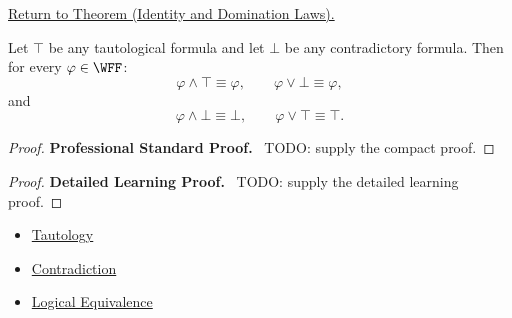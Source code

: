\newpage
{}
\label{prf:identity-domination-laws-propositional-logic}

\begin{remark*}[Return]
\hyperref[thm:identity-domination-laws-propositional-logic]{Return to Theorem (Identity and Domination Laws).}
\end{remark*}

\begin{theorem*}
Let \(\top\) be any tautological formula and let \(\bot\) be any contradictory formula. Then for every \(\varphi\in\WFF\):
\[
\varphi\land\top\equiv\varphi,
\qquad
\varphi\lor\bot\equiv\varphi,
\]
and
\[
\varphi\land\bot\equiv\bot,
\qquad
\varphi\lor\top\equiv\top.
\]
\end{theorem*}

\begin{proof}
\textbf{Professional Standard Proof.}~
TODO: supply the compact proof.
\end{proof}

\begin{proof}
\textbf{Detailed Learning Proof.}~
TODO: supply the detailed learning proof.
\end{proof}

\begin{remark*}
\end{remark*}

\begin{dependencies}
\begin{itemize}
  \item \hyperref[def:tautology-propositional-logic]{Tautology}
  \item \hyperref[def:contradiction-propositional-logic]{Contradiction}
  \item \hyperref[def:logical-equivalence-propositional-logic]{Logical Equivalence}
\end{itemize}
\end{dependencies}

\clearpage
